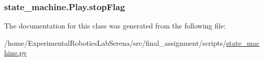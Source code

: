 \subsubsection[{\texorpdfstring{stop\+Flag}{stopFlag}}]{\setlength{\rightskip}{0pt plus 5cm}state\+\_\+machine.\+Play.\+stop\+Flag\hspace{0.3cm}{\ttfamily [static]}}\hypertarget{classstate__machine_1_1Play_a60431dacf2811b3dc7e954473c281985}{}\label{classstate__machine_1_1Play_a60431dacf2811b3dc7e954473c281985}


The documentation for this class was generated from the following file\+:\begin{DoxyCompactItemize}
\item 
/home/\+Experimental\+Robotics\+Lab\+Serena/src/final\+\_\+assignment/scripts/\hyperlink{state__machine_8py}{state\+\_\+machine.\+py}\end{DoxyCompactItemize}
